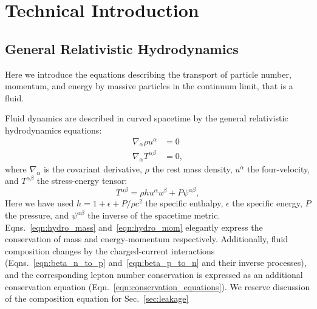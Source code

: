 \chapter{Technical Introduction}
\label{chap:intro}



\section{General Relativistic Hydrodynamics}
\label{sec:gr_hydro}
Here we introduce the equations describing the transport of particle number,
momentum, and energy by massive particles in the continuum limit, that is
a fluid.

Fluid dynamics are described in curved spacetime by the general relativistic
hydrodynamics equations:
\begin{align}
  \label{eqn:hydro_mass}
  \nabla_\alpha \rho u^\alpha &= 0 \\
  \label{eqn:hydro_mom}
  \nabla_\alpha T^{\alpha\beta} &= 0,
\end{align}
where $\nabla_\alpha$ is the covariant derivative,
$\rho$ the rest mass density,
$u^\alpha$ the four-velocity,
and $T^{\alpha\beta}$ the stress-energy tensor:
\begin{equation}
  \label{eqn:stress_energy}
  T^{\alpha\beta} = \rho h u^\alpha u^\beta + P \psi^{\alpha\beta},
\end{equation}
Here we have used $h=1+\epsilon+P/\rho c^2$ the specific enthalpy,
$\epsilon$ the specific energy,
$P$ the pressure, and
$\psi^{\alpha\beta}$ the inverse of the spacetime metric.
Eqns.~\ref{eqn:hydro_mass} and~\ref{eqn:hydro_mom} elegantly express the
conservation of mass and energy-momentum respectively.
Additionally, fluid composition changes by the charged-current interactions
(Eqns.~\ref{eqn:beta_n_to_p} and~\ref{eqn:beta_p_to_n} and their inverse processes),
and the corresponding lepton number conservation is expressed as an additional
conservation equation (Eqn.~\ref{eqn:conservation_equations}).
We reserve discussion of the composition equation for Sec.~\ref{sec:leakage}

